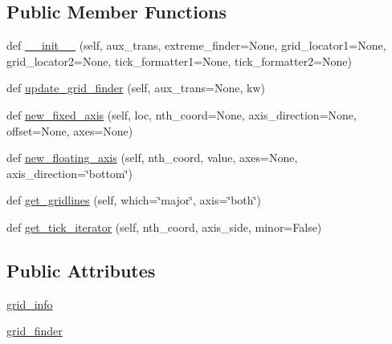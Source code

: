 \subsection*{Public Member Functions}
\begin{DoxyCompactItemize}
\item 
def \hyperlink{classaxisartist_1_1grid__helper__curvelinear_1_1GridHelperCurveLinear_ae217a60ad6b884d7bf4e0e1f3098b34c}{\+\_\+\+\_\+init\+\_\+\+\_\+} (self, aux\+\_\+trans, extreme\+\_\+finder=None, grid\+\_\+locator1=None, grid\+\_\+locator2=None, tick\+\_\+formatter1=None, tick\+\_\+formatter2=None)
\item 
def \hyperlink{classaxisartist_1_1grid__helper__curvelinear_1_1GridHelperCurveLinear_ae9e6dd2e5fb798bb8faa9355556bdccc}{update\+\_\+grid\+\_\+finder} (self, aux\+\_\+trans=None, kw)
\item 
def \hyperlink{classaxisartist_1_1grid__helper__curvelinear_1_1GridHelperCurveLinear_ac3de1228a04e87145d39fecc6f2b2635}{new\+\_\+fixed\+\_\+axis} (self, loc, nth\+\_\+coord=None, axis\+\_\+direction=None, offset=None, axes=None)
\item 
def \hyperlink{classaxisartist_1_1grid__helper__curvelinear_1_1GridHelperCurveLinear_a03bceb173a28cf8c4442e6749a42899c}{new\+\_\+floating\+\_\+axis} (self, nth\+\_\+coord, value, axes=None, axis\+\_\+direction=\char`\"{}bottom\char`\"{})
\item 
def \hyperlink{classaxisartist_1_1grid__helper__curvelinear_1_1GridHelperCurveLinear_ab02c3394990083944411baa2f0e95557}{get\+\_\+gridlines} (self, which=\char`\"{}major\char`\"{}, axis=\char`\"{}both\char`\"{})
\item 
def \hyperlink{classaxisartist_1_1grid__helper__curvelinear_1_1GridHelperCurveLinear_a2a26c62628cbb6596135ab88d9984752}{get\+\_\+tick\+\_\+iterator} (self, nth\+\_\+coord, axis\+\_\+side, minor=False)
\end{DoxyCompactItemize}
\subsection*{Public Attributes}
\begin{DoxyCompactItemize}
\item 
\hyperlink{classaxisartist_1_1grid__helper__curvelinear_1_1GridHelperCurveLinear_aa2598de9e52ebe83b68707cc031690bb}{grid\+\_\+info}
\item 
\hyperlink{classaxisartist_1_1grid__helper__curvelinear_1_1GridHelperCurveLinear_a1ba6f817acc6b51a63291bfaf5a3018c}{grid\+\_\+finder}
\end{DoxyCompactItemize}



